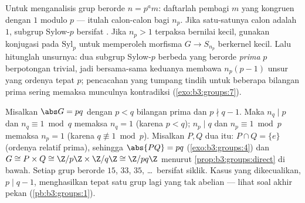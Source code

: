 \begin{method}\label{met:b3:groups:sylowmethod}
Untuk menganalisis grup berorde $n = p^a m$: daftarlah pembagi
$m$ yang kongruen dengan $1$ modulo $p$ --- itulah calon-calon bagi
$n_p$. Jika satu-satunya calon adalah $1$, subgrup Sylow-$p$ bersifat
. Jika $n_p > 1$ terpaksa bernilai kecil, gunakan  konjugasi pada
$\mathrm{Syl}_p$ untuk memperoleh morfisma $G \to S_{n_p}$ berkernel kecil.
Lalu hitunglah unsurnya: dua subgrup Sylow-$p$ berbeda yang berorde
\emph{prima} $p$ berpotongan trivial, jadi bersama-sama keduanya membawa
$n_p(p-1)$ unsur yang ordenya tepat $p$; pencacahan yang tumpang tindih untuk
beberapa bilangan prima sering memaksa munculnya kontradiksi
(\cref{exo:b3:groups:7}).
\end{method}

\begin{example}\label{ex:b3:groups:pq}
Misalkan $\abs G = pq$ dengan $p < q$ bilangan prima dan $p \nmid q - 1$. Maka
$n_q \mid p$ dan $n_q \equiv 1 \bmod q$ memaksa $n_q = 1$ (karena $p <
q$); $n_p \mid q$ dan $n_p \equiv 1 \bmod p$ memaksa $n_p = 1$ (karena $q
\not\equiv 1 \bmod p$). Misalkan $P, Q$ dua   itu: $P
\cap Q = \{e\}$ (ordenya relatif prima), sehingga $\abs{PQ} = pq$
(\cref{exo:b3:groups:4}) dan $G \cong P \times Q \cong \Z/p\Z
\times \Z/q\Z \cong \Z/pq\Z$ menurut
\cref{prop:b3:groups:direct} di bawah. Setiap grup berorde $15$,
$33$, $35$, \dots\ bersifat siklik. Kasus yang dikecualikan, $p \mid q - 1$,
menghasilkan tepat satu grup lagi yang tak abelian --- lihat soal
akhir pekan (\cref{pb:b3:groups:1}).
\end{example}

